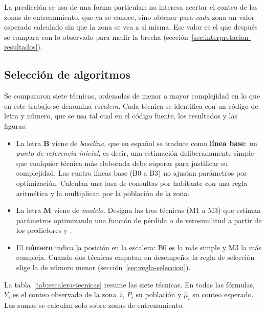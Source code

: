 La predicción se usa de una forma particular: no interesa acertar el conteo de las zonas
de entrenamiento, que ya se conoce, sino obtener para \emph{cada} zona un valor esperado
calculado sin que la zona se vea a sí misma. Ese valor es el que después se compara con lo
observado para medir la brecha (sección~\ref{sec:interpretacion-resultados}).

\subsection{Selección de algoritmos}
\label{sec:seleccion-algoritmos}

Se compararon siete técnicas, ordenadas de menor a mayor complejidad en lo que en este
trabajo se denomina \emph{escalera}. Cada técnica se identifica con un código de letra y
número, que se usa tal cual en el código fuente, los resultados y las figuras:

\begin{itemize}
  \item La letra \textbf{B} viene de \emph{baseline}, que en español se traduce como
    \textbf{línea base}: un \emph{punto de referencia inicial}, es decir, una estimación
    deliberadamente simple que cualquier técnica más elaborada debe superar para justificar
    su complejidad. Las cuatro líneas base (B0 a B3) no ajustan parámetros por optimización.
    Calculan una tasa de consultas por habitante con una regla aritmética y la multiplican
    por la población de la zona.
  \item La letra \textbf{M} viene de \emph{modelo}. Designa las tres técnicas (M1 a M3) que
    estiman parámetros optimizando una función de pérdida o de verosimilitud a partir de
    los predictores  y .
  \item El \textbf{número} indica la posición en la escalera: B0 es la más simple y M3 la
    más compleja. Cuando dos técnicas empatan en desempeño, la regla de selección elige la
    de número menor (sección~\ref{sec:regla-seleccion}).
\end{itemize}

La tabla~\ref{tab:escalera-tecnicas} resume las siete técnicas. En todas las fórmulas,
$Y_i$ es el conteo observado de la zona~$i$, $P_i$ su población y $\hat{\mu}_i$ su conteo
esperado. Las sumas se calculan solo sobre zonas de entrenamiento.

